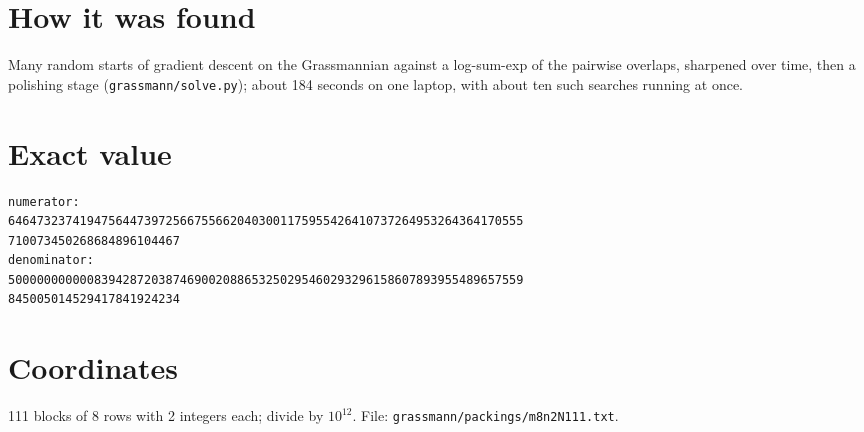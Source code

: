 \documentclass[11pt,a4paper]{article}
\begin{document}
\section{How it was found}
Many random starts of gradient descent on the Grassmannian against a log-sum-exp of the pairwise overlaps, sharpened over time, then a polishing stage (\texttt{grassmann/solve.py}); about 184 seconds on one laptop, with about ten such searches running at once.


\appendix
\section{Exact value}
{\small
\begin{verbatim}
numerator:
646473237419475644739725667556620403001175955426410737264953264364170555
710073450268684896104467
denominator:
500000000000839428720387469002088653250295460293296158607893955489657559
845005014529417841924234
\end{verbatim}}

\section{Coordinates}
111 blocks of 8 rows with 2 integers each; divide by $10^{12}$. File: \texttt{grassmann/packings/m8n2N111.txt}.
{\tiny
\begin{multicols}{4}
\end{multicols}}
\end{document}
